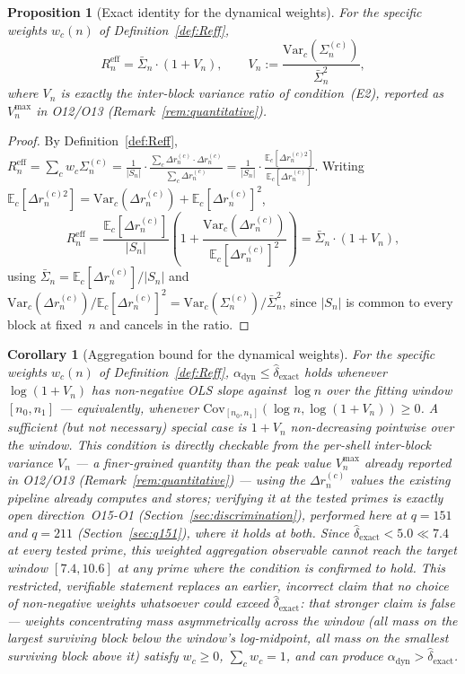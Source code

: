 \documentclass[11pt,a4paper]{article}
\newtheorem{proposition}[theorem]{Proposition}
\newtheorem{corollary}[theorem]{Corollary}
\newcommand{\Sn}{\bar{\Sigma}_n}
\newcommand{\dexact}{\hat{\delta}_{\mathrm{exact}}}
\newcommand{\Reff}{R_n^{\mathrm{eff}}}
\begin{document}
\begin{proposition}[Exact identity for the dynamical weights]
\label{prop:exact-identity}
For the specific weights $w_c(n)$ of Definition~\ref{def:Reff},
\begin{equation}
\label{eq:exact-identity}
\Reff = \Sn \cdot (1 + V_n), \qquad
V_n := \frac{\mathrm{Var}_c(\Sigma_n^{(c)})}{\Sn^2},
\end{equation}
where $V_n$ is exactly the inter-block variance ratio of condition~(E2),
reported as $V_n^{\max}$ in O12/O13 (Remark~\ref{rem:quantitative}).
\end{proposition}

\begin{proof}
By Definition~\ref{def:Reff},
$\Reff = \sum_c w_c\Sigma_n^{(c)}
= \frac{1}{|S_n|}\cdot\frac{\sum_c \Delta r_n^{(c)}\cdot\Delta r_n^{(c)}}{\sum_c\Delta r_n^{(c)}}
= \frac{1}{|S_n|}\cdot\frac{\mathbb{E}_c[\Delta r_n^{(c)2}]}{\mathbb{E}_c[\Delta r_n^{(c)}]}$.
Writing $\mathbb{E}_c[\Delta r_n^{(c)2}] = \mathrm{Var}_c(\Delta r_n^{(c)}) + \mathbb{E}_c[\Delta r_n^{(c)}]^2$,
\[
\Reff = \frac{\mathbb{E}_c[\Delta r_n^{(c)}]}{|S_n|}
\left(1+\frac{\mathrm{Var}_c(\Delta r_n^{(c)})}{\mathbb{E}_c[\Delta r_n^{(c)}]^2}\right)
= \Sn\cdot(1+V_n),
\]
using $\Sn = \mathbb{E}_c[\Delta r_n^{(c)}]/|S_n|$ and
$\mathrm{Var}_c(\Delta r_n^{(c)})/\mathbb{E}_c[\Delta r_n^{(c)}]^2
= \mathrm{Var}_c(\Sigma_n^{(c)})/\Sn^2$, since $|S_n|$ is common to every
block at fixed~$n$ and cancels in the ratio.
\end{proof}

\begin{corollary}[Aggregation bound for the dynamical weights]
\label{cor:nogo}
For the specific weights $w_c(n)$ of Definition~\ref{def:Reff},
$\alpha_{\mathrm{dyn}} \leq \dexact$ holds whenever $\log(1+V_n)$ has
non-negative OLS slope against $\log n$ over the fitting window
$[n_0,n_1]$ — equivalently, whenever $\mathrm{Cov}_{[n_0,n_1]}(\log n,
\log(1+V_n))\geq 0$.
A sufficient (but not necessary) special case is $1+V_n$ non-decreasing
pointwise over the window.
This condition is directly checkable from the per-shell inter-block variance
$V_n$ — a finer-grained quantity than the peak value $V_n^{\max}$ already
reported in O12/O13 (Remark~\ref{rem:quantitative}) — using the
$\Delta r_n^{(c)}$ values the existing pipeline already computes and stores;
verifying it at the tested primes is exactly open direction~O15-O1
(Section~\ref{sec:discrimination}), performed here at $q=151$ and
$q=211$ (Section~\ref{sec:q151}), where it holds at both.
Since $\dexact < 5.0 \ll 7.4$ at every tested prime, this weighted
aggregation observable cannot reach the target window $[7.4, 10.6]$ at any
prime where the condition is confirmed to hold.
This restricted, verifiable statement replaces an earlier, incorrect claim
that no choice of non-negative weights whatsoever could exceed $\dexact$:
that stronger claim is false — weights concentrating mass asymmetrically
across the window (all mass on the largest surviving block below the
window's log-midpoint, all mass on the smallest surviving block above it)
satisfy $w_c\geq0$, $\sum_c w_c=1$, and can produce
$\alpha_{\mathrm{dyn}}>\dexact$.
\end{corollary}
\end{document}

